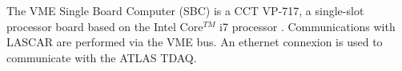 The VME Single Board Computer (SBC) is a CCT VP-717, a single-slot processor board based on the Intel Core$^{TM}$ i7 processor \cite{ref:vmesbc}. Communications with LASCAR are performed via the VME bus. An ethernet connexion is used to communicate with the ATLAS TDAQ. 

